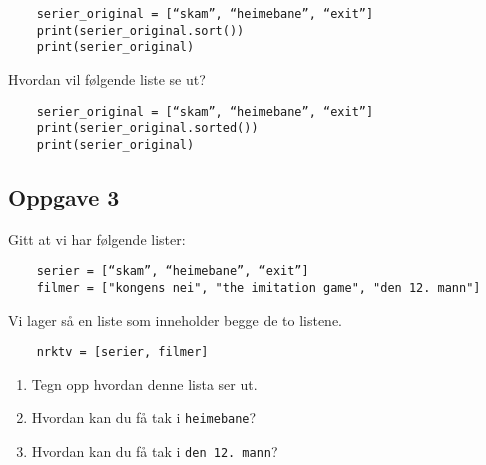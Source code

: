 \documentclass{article}
\begin{document}
\begin{verbatim}
    serier_original = [“skam”, “heimebane”, “exit”]
    print(serier_original.sort())
    print(serier_original)
\end{verbatim}
\noindent
Hvordan vil følgende liste se ut? 
\begin{verbatim}
    serier_original = [“skam”, “heimebane”, “exit”]
    print(serier_original.sorted())
    print(serier_original)
\end{verbatim}


\subsection*{Oppgave 3}

Gitt at vi har følgende lister:
\begin{verbatim}
    serier = [“skam”, “heimebane”, “exit”]
    filmer = ["kongens nei", "the imitation game", "den 12. mann"]
\end{verbatim}

Vi lager så en liste som inneholder begge de to listene.

\begin{verbatim}
    nrktv = [serier, filmer]
\end{verbatim}

\begin{enumerate}
    \item Tegn opp hvordan denne lista ser ut.
    \item Hvordan kan du få tak i \texttt{heimebane}?
    \item Hvordan kan du få tak i \texttt{den 12. mann}?
\end{enumerate}
\end{document}
